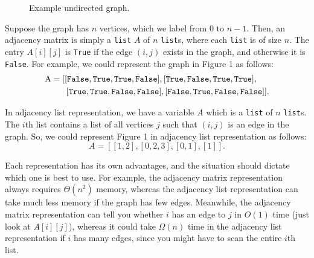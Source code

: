 \documentclass[11pt]{article}
\begin{document}
\begin{figure}[!!h]
\begin{center}
\end{center}
\caption{Example undirected graph.}
\end{figure}

Suppose the graph has $n$ vertices, which we label
from $0$ to $n-1$.  Then, an adjacency matrix is simply a
\texttt{list} $A$ of $n$ \texttt{list}s, where each \texttt{list} is
of size $n$.  The entry $A[i][j]$ is \texttt{True} if the edge $(i,j)$
exists in
the graph, and otherwise it is \texttt{False}.  For example, we could
represent
the graph in Figure 1 as follows:
\begin{align*}
 \mathrm{A} &= [ [\texttt{False}, \texttt{True}, \texttt{True},
\texttt{False}], [\texttt{True}, \texttt{False}, \texttt{True},
\texttt{True}], \\
&\hspace*{.25in}[\texttt{True}, \texttt{True}, \texttt{False},
\texttt{False}], [\texttt{False}, \texttt{True}, \texttt{False},
\texttt{False}] ] .
\end{align*}

In adjacency list representation, we have a variable $A$ which is a
\texttt{list} of $n$ \texttt{list}s.  The $i$th list contains a list
of all vertices $j$ such that $(i,j)$ is an edge in the graph.  So,
we could represent Figure 1 in adjacency list representation as
follows:
$$ A = [ [1, 2], [0, 2, 3], [0, 1], [1] ] .$$

Each representation has its own advantages, and the situation should
dictate which one is best to use.  For example, the adjacency matrix
representation always requires $\Theta(n^2)$ memory, whereas the
adjacency list representation can take much less memory if the graph
has few edges.  Meanwhile, the adjacency matrix representation can
tell you whether $i$ has an edge to $j$ in $O(1)$ time (just look at
$A[i][j]$), whereas it could take $\Omega(n)$ time in the adjacency
list representation if $i$ has many edges, since you might have to
scan the entire $i$th list.
\end{document}
